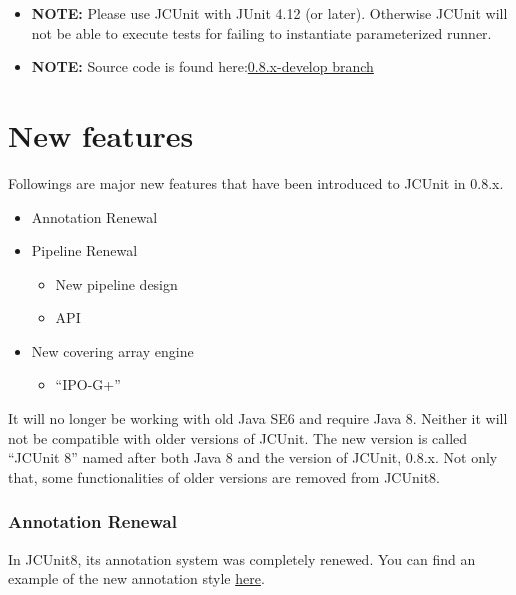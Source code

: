 \begin{itemize}
\tightlist
\item
  \textbf{NOTE:} Please use JCUnit with JUnit 4.12 (or later). Otherwise
  JCUnit will not be able to execute tests for failing to instantiate
  parameterized runner.
\item
  \textbf{NOTE:} Source code is found
  here:\href{https://github.com/dakusui/jcunit/tree/0.8.x-develop}{0.8.x-develop
  branch}
\end{itemize}

\section{New features}\label{new-features}

Followings are major new features that have been introduced to JCUnit in
0.8.x.

\begin{itemize}
\tightlist
\item
  Annotation Renewal
\item
  Pipeline Renewal

  \begin{itemize}
  \tightlist
  \item
    New pipeline design
  \item
    API
  \end{itemize}
\item
  New covering array engine

  \begin{itemize}
  \tightlist
  \item
    ``IPO-G+''
  \end{itemize}
\end{itemize}

It will no longer be working with old Java SE6 and require Java 8.
Neither it will not be compatible with older versions of JCUnit. The new
version is called ``JCUnit 8'' named after both Java 8 and the version
of JCUnit, 0.8.x. Not only that, some functionalities of older versions
are removed from JCUnit8.

\subsubsection{Annotation Renewal}\label{annotation-renewal}

In JCUnit8, its annotation system was completely renewed. You can find
an example of the new annotation style
\href{/src/java/test/com/github/dakusui/jcunit8/examples/BankAccountExample.java}{here}.

